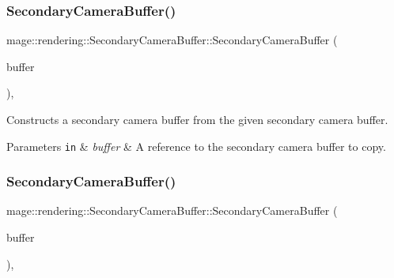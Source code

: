 \subsubsection{\texorpdfstring{Secondary\+Camera\+Buffer()}{SecondaryCameraBuffer()}\hspace{0.1cm}{\footnotesize\ttfamily [2/3]}}
{\footnotesize\ttfamily mage\+::rendering\+::\+Secondary\+Camera\+Buffer\+::\+Secondary\+Camera\+Buffer (\begin{DoxyParamCaption}\item[{const \hyperlink{structmage_1_1rendering_1_1_secondary_camera_buffer}{Secondary\+Camera\+Buffer} \&}]{buffer }\end{DoxyParamCaption})\hspace{0.3cm}{\ttfamily [default]}, {\ttfamily [noexcept]}}

Constructs a secondary camera buffer from the given secondary camera buffer.


\begin{DoxyParams}[1]{Parameters}
\mbox{\tt in}  & {\em buffer} & A reference to the secondary camera buffer to copy. \\
\hline
\end{DoxyParams}
\hypertarget{structmage_1_1rendering_1_1_secondary_camera_buffer_a72efd73a7db74ad11f12c720b557cf0e}{}\label{structmage_1_1rendering_1_1_secondary_camera_buffer_a72efd73a7db74ad11f12c720b557cf0e} 
\subsubsection{\texorpdfstring{Secondary\+Camera\+Buffer()}{SecondaryCameraBuffer()}\hspace{0.1cm}{\footnotesize\ttfamily [3/3]}}
{\footnotesize\ttfamily mage\+::rendering\+::\+Secondary\+Camera\+Buffer\+::\+Secondary\+Camera\+Buffer (\begin{DoxyParamCaption}\item[{\hyperlink{structmage_1_1rendering_1_1_secondary_camera_buffer}{Secondary\+Camera\+Buffer} \&\&}]{buffer }\end{DoxyParamCaption})\hspace{0.3cm}{\ttfamily [default]}, {\ttfamily [noexcept]}}

